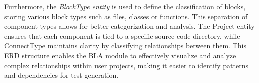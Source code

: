 \hspace{0.5cm}Furthermore, the \textit{BlockType entity} is used to define the classification of blocks, storing various block types such as files, classes or functions. This separation of component types allows for better categorization and analysis. The Project entity ensures that each component is tied to a specific source code directory, while ConnectType maintains clarity by classifying relationships between them. This ERD structure enables the BLA module to effectively visualize and analyze complex relationships within user projects, making it easier to identify patterns and dependencies for test generation.



